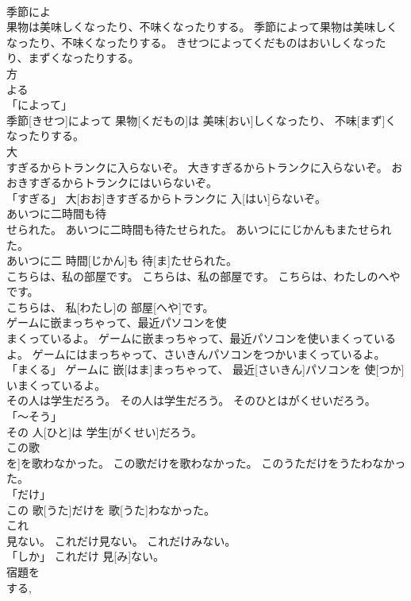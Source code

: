 \documentclass[8pt]{extreport}
\begin{document}
\begin{CJK}{UTF8}{min}
\\	季節によ
\\	果物は美味しくなったり、不味くなったりする。	季節によって果物は美味しくなったり、不味くなったりする。	きせつによってくだものはおいしくなったり、まずくなったりする。	
\\	方 
\\	よる 
\\	「によって」 
\\	季節[きせつ]によって 果物[くだもの]は 美味[おい]しくなったり、 不味[まず]くなったりする。		
\\	大
\\	すぎるからトランクに入らないぞ。	大きすぎるからトランクに入らないぞ。	おおきすぎるからトランクにはいらないぞ。	
\\	「すぎる」	大[おお]きすぎるからトランクに 入[はい]らないぞ。		
\\	あいつに二時間も待
\\	せられた。	あいつに二時間も待たせられた。	あいつににじかんもまたせられた。	
\\	あいつに二 時間[じかん]も 待[ま]たせられた。		
\\	こちらは、私の部屋です。	こちらは、私の部屋です。	こちらは、わたしのへやです。	
\\	こちらは、 私[わたし]の 部屋[へや]です。		
\\	ゲームに嵌まっちゃって、最近パソコンを使
\\	まくっているよ。	ゲームに嵌まっちゃって、最近パソコンを使いまくっているよ。	ゲームにはまっちゃって、さいきんパソコンをつかいまくっているよ。	
\\	「まくる」	ゲームに 嵌[はま]まっちゃって、 最近[さいきん]パソコンを 使[つか]いまくっているよ。		
\\	その人は学生だろう。	その人は学生だろう。	そのひとはがくせいだろう。	
\\	「～そう」 
\\	その 人[ひと]は 学生[がくせい]だろう。		
\\	この歌
\\	を]を歌わなかった。	この歌だけを歌わなかった。	このうただけをうたわなかった。	
\\	「だけ」 
\\	この 歌[うた]だけを 歌[うた]わなかった。		
\\	これ
\\	見ない。	これだけ見ない。	これだけみない。	
\\	「しか」	これだけ 見[み]ない。		
\\	宿題を
\\	する, 

\end{CJK}
\end{document}
